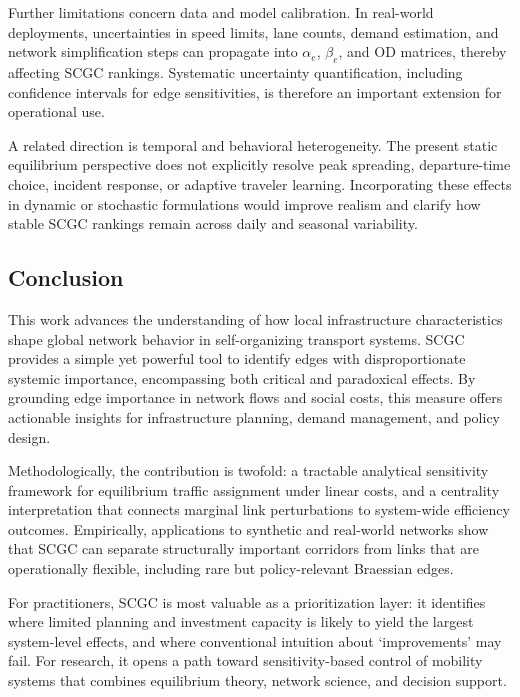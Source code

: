\documentclass[twocolumn,english,groupedaddress, superscriptaddress,aps,pre,10pt,floatfix]{revtex4-2}
\begin{document}
Further limitations concern data and model calibration. In real-world deployments, uncertainties in speed limits, lane counts, demand estimation, and network simplification steps can propagate into $\alpha_e$, $\beta_e$, and OD matrices, thereby affecting SCGC rankings. Systematic uncertainty quantification, including confidence intervals for edge sensitivities, is therefore an important extension for operational use.

A related direction is temporal and behavioral heterogeneity. The present static equilibrium perspective does not explicitly resolve peak spreading, departure-time choice, incident response, or adaptive traveler learning. Incorporating these effects in dynamic or stochastic formulations would improve realism and clarify how stable SCGC rankings remain across daily and seasonal variability.



\subsection{Conclusion}

This work advances the understanding of how local infrastructure characteristics shape global network behavior in self-organizing transport systems. SCGC provides a simple yet powerful tool to identify edges with disproportionate systemic importance, encompassing both critical and paradoxical effects. By grounding edge importance in network flows and social costs, this measure offers actionable insights for infrastructure planning, demand management, and policy design.

Methodologically, the contribution is twofold: a tractable analytical sensitivity framework for equilibrium traffic assignment under linear costs, and a centrality interpretation that connects marginal link perturbations to system-wide efficiency outcomes. Empirically, applications to synthetic and real-world networks show that SCGC can separate structurally important corridors from links that are operationally flexible, including rare but policy-relevant Braessian edges.

For practitioners, SCGC is most valuable as a prioritization layer: it identifies where limited planning and investment capacity is likely to yield the largest system-level effects, and where conventional intuition about `improvements' may fail. For research, it opens a path toward sensitivity-based control of mobility systems that combines equilibrium theory, network science, and decision support.
\end{document}
